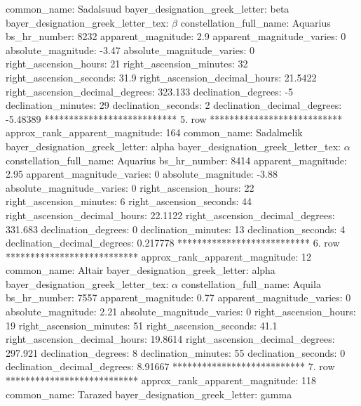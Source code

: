                        common_name: Sadalsuud
    bayer_designation_greek_letter: beta
bayer_designation_greek_letter_tex: $\beta$
           constellation_full_name: Aquarius
                      bs_hr_number: 8232
                apparent_magnitude: 2.9
         apparent_magnitude_varies: 0
                absolute_magnitude: -3.47
         absolute_magnitude_varies: 0
             right_ascension_hours: 21
           right_ascension_minutes: 32
           right_ascension_seconds: 31.9
     right_ascension_decimal_hours: 21.5422
   right_ascension_decimal_degrees: 323.133
               declination_degrees: -5
               declination_minutes: 29
               declination_seconds: 2
       declination_decimal_degrees: -5.48389
*************************** 5. row ***************************
    approx_rank_apparent_magnitude: 164
                       common_name: Sadalmelik
    bayer_designation_greek_letter: alpha
bayer_designation_greek_letter_tex: $\alpha$
           constellation_full_name: Aquarius
                      bs_hr_number: 8414
                apparent_magnitude: 2.95
         apparent_magnitude_varies: 0
                absolute_magnitude: -3.88
         absolute_magnitude_varies: 0
             right_ascension_hours: 22
           right_ascension_minutes: 6
           right_ascension_seconds: 44
     right_ascension_decimal_hours: 22.1122
   right_ascension_decimal_degrees: 331.683
               declination_degrees: 0
               declination_minutes: 13
               declination_seconds: 4
       declination_decimal_degrees: 0.217778
*************************** 6. row ***************************
    approx_rank_apparent_magnitude: 12
                       common_name: Altair
    bayer_designation_greek_letter: alpha
bayer_designation_greek_letter_tex: $\alpha$
           constellation_full_name: Aquila
                      bs_hr_number: 7557
                apparent_magnitude: 0.77
         apparent_magnitude_varies: 0
                absolute_magnitude: 2.21
         absolute_magnitude_varies: 0
             right_ascension_hours: 19
           right_ascension_minutes: 51
           right_ascension_seconds: 41.1
     right_ascension_decimal_hours: 19.8614
   right_ascension_decimal_degrees: 297.921
               declination_degrees: 8
               declination_minutes: 55
               declination_seconds: 0
       declination_decimal_degrees: 8.91667
*************************** 7. row ***************************
    approx_rank_apparent_magnitude: 118
                       common_name: Tarazed
    bayer_designation_greek_letter: gamma
